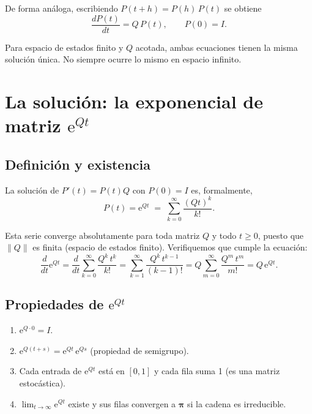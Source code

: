 \documentclass[11pt,a4paper]{article}
\theoremstyle{definition}
\theoremstyle{remark}
\newcommand{\e}{\mathrm{e}}
\begin{document}
De forma análoga, escribiendo $P(t+h) = P(h)\,P(t)$ se obtiene
\[
  \frac{dP(t)}{dt} = Q\,P(t), \qquad P(0) = I.
\]

\begin{cajanota}
Para espacio de estados finito y $Q$ acotada, ambas ecuaciones tienen la
misma solución única.  No siempre ocurre lo mismo en espacio infinito.
\end{cajanota}

\section{La solución: la exponencial de matriz \texorpdfstring{$\e^{Qt}$}{exp(Qt)}}

\subsection{Definición y existencia}

La solución de $P'(t) = P(t)Q$ con $P(0)=I$ es, formalmente,
\[
  \boxed{P(t) = \e^{Qt} \;=\; \sum_{k=0}^{\infty} \frac{(Qt)^k}{k!}.}
\]

Esta serie converge absolutamente para toda matriz $Q$ y todo $t \ge 0$,
puesto que $\|Q\|$ es finita (espacio de estados finito).  Verifiquemos
que cumple la ecuación:
\[
  \frac{d}{dt}\e^{Qt}
  = \frac{d}{dt}\sum_{k=0}^{\infty}\frac{Q^k\,t^k}{k!}
  = \sum_{k=1}^{\infty}\frac{Q^k\,t^{k-1}}{(k-1)!}
  = Q\sum_{m=0}^{\infty}\frac{Q^m\,t^m}{m!}
  = Q\,\e^{Qt}.
\]

\subsection{Propiedades de \texorpdfstring{$\e^{Qt}$}{exp(Qt)}}

\begin{enumerate}[nosep]
  \item $\e^{Q \cdot 0} = I$.
  \item $\e^{Q(t+s)} = \e^{Qt}\,\e^{Qs}$ \quad (propiedad de semigrupo).
  \item Cada entrada de $\e^{Qt}$ está en $[0,1]$ y cada fila suma 1
        (es una matriz estocástica).
  \item $\lim_{t\to\infty}\e^{Qt}$ existe y sus filas convergen a
        $\boldsymbol{\pi}$ si la cadena es irreducible.
\end{enumerate}
\end{document}
